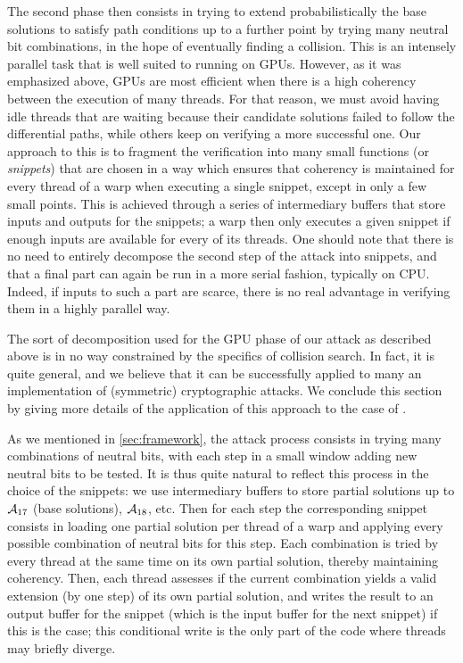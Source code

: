 The second phase then consists in trying to extend probabilistically the base solutions to satisfy path conditions up to a further point by
trying many neutral bit combinations, in the hope of eventually finding a collision.
This is an intensely parallel task that is well suited to running on GPUs. However, as it
was emphasized above, GPUs are most efficient when there is a high coherency between the execution of many threads. For that reason,
we must avoid having idle threads that are waiting because their candidate solutions failed to follow the differential paths, while
others keep on verifying a more successful one. Our approach to this is to fragment the verification into many small functions
(or \emph{snippets})
that are chosen in a way which ensures that coherency is maintained for every thread of a warp when executing a single snippet, except in
only a few small points. This is achieved through a series of intermediary buffers that store inputs and outputs for the snippets;
a warp then only executes a given snippet if enough inputs are available for every of its threads.
One should note that there is no need to entirely decompose the second step of the attack into snippets, and that a final part can again
be run in a more serial fashion, typically on CPU. Indeed, if inputs to such a part are scarce, there is no real advantage in verifying them in
a highly parallel way.


The sort of decomposition used for the GPU phase of our attack as described above is in no way constrained by the specifics of \shaone collision search.
In fact, it is quite general, and we believe that it can be successfully applied to many an implementation of (symmetric) cryptographic
attacks. We conclude this section by giving more details of the application of this approach to the case of \shaone.


\bigskip

As we mentioned in \autoref{sec:framework}, the attack process consists in trying many combinations of neutral bits, with each step in a small window
adding new neutral bits to be tested. It is thus quite natural to reflect this process in the choice of the snippets:
we use intermediary buffers to store partial solutions up to $\mathcal{A}_{17}$ (\ie base solutions), $\mathcal{A}_{18}$, etc.
Then for each step the corresponding snippet consists
in loading one partial solution per thread of a warp and applying every possible combination of neutral bits for this step. Each combination
is tried by every thread at the same time on its own partial solution, thereby maintaining coherency.
Then, each thread assesses if the current combination yields a valid extension (by one step) of its own partial solution, and writes the result to
an output buffer for the snippet (which is the input buffer for the next snippet) if this is the case;
this conditional write is the only part of the code where threads may briefly diverge.

